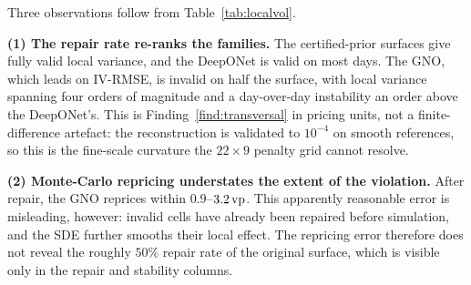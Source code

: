 \begin{table}[htbp]\centering\small
\caption{Local-volatility validity and repricing on the real staging days (2018-01-08 for
deep/SSVI; ranges over the ten 2025-08 days for the operators and their SSVI baseline).
Repair rate = share of the grid where \eqref{eq:dupirekw} is invalid. Stability = mean
$|\Delta\sigma_{\mathrm{loc}}|$ between consecutive days (\vp). Source: Notebook 05, \S A.}
\label{tab:localvol}
\end{table}

Three observations follow from Table~\ref{tab:localvol}.

\textbf{(1) The repair rate re-ranks the families.} The certified-prior surfaces give fully valid
local variance, and the DeepONet is valid on most days. The GNO, which leads on
IV-RMSE, is invalid on half the surface, with local variance spanning four orders of magnitude
and a day-over-day instability an order above the DeepONet's. This is
Finding~\ref{find:transversal} in pricing units, not a finite-difference artefact: the
reconstruction is validated to $10^{-4}$ on smooth references, so this is the fine-scale
curvature the $22\times9$ penalty grid cannot resolve.

\textbf{(2) Monte-Carlo repricing understates the extent of the violation.} After repair, the
GNO reprices within $0.9$--$3.2\,\text{vp}$. This apparently reasonable error is misleading, however:
invalid cells have already been repaired before simulation, and the SDE further smooths their
local effect. The repricing error therefore does not reveal the roughly $50\%$ repair rate of the
original surface, which is visible only in the repair and stability columns.

